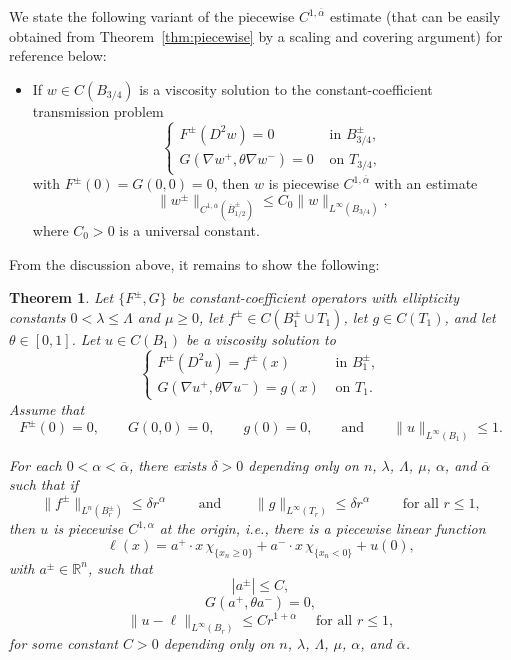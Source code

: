 \documentclass[letter,11pt]{amsart}
\newcommand{\R}{\mathbb{R}}
\newcommand{\chara}[1]{\chi_{#1}}
\newtheorem{thm}{Theorem}[section]
\theoremstyle{definition}
\numberwithin{equation}{section}
\begin{document}
\medskip

We state the following variant of the piecewise $C^{1,\overline{\alpha}}$ estimate (that can be easily obtained from Theorem~\ref{thm:piecewise} by a scaling and covering argument) for reference below:
\begin{itemize}
\item
If $w \in C(B_{3/4})$ is a viscosity solution to the constant-coefficient transmission problem
\[
\begin{cases}
F^{\pm}(D^2 w) = 0 & \text{ in } B_{3/4}^{\pm},\\
G(\nabla w^{+}, \theta \nabla w^{-}) = 0 & \text{ on } T_{3/4},
\end{cases}
\]
with $F^{\pm}(0) = G(0, 0) = 0$,
then $w$ is piecewise $C^{1,\overline{\alpha}}$ with an estimate
\begin{equation}
\label{fund2}
\|w^{\pm}\|_{C^{1,\overline{\alpha}}(\overline{B}^{\pm}_{1/2})} 
\leq C_0 \|w\|_{L^{\infty}(B_{3/4})},
\end{equation}
where $C_0 > 0$ is a universal constant.
\end{itemize}

\medskip

From the discussion above, it remains to show the following:

\begin{thm}
Let $\{F^{\pm}, G\}$ be constant-coefficient operators with ellipticity constants $0 < \lambda \leq \Lambda$ and $\mu \geq 0$, let $f^{\pm} \in C(B_1^{\pm} \cup T_1)$, let $g \in C(T_1)$, and let $\theta \in [0,1]$.
Let $u \in C(B_1)$ be a viscosity solution to 
\[
\begin{cases}
F^{\pm}(D^2 u) = f^{\pm}(x) & \text{ in } B_{1}^{\pm},\\
G(\nabla u^{+}, \theta \nabla u^{-}) = g(x) &\text{ on } T_{1}.
\end{cases}
\]
Assume that 
\begin{equation}
\label{ao1}
F^{\pm}(0) = 0, \qquad G(0,0) = 0, \qquad g(0) = 0, \qquad \text{and} \qquad \|u\|_{L^{\infty}(B_1)} \leq 1.
\end{equation}

For each $0 < \alpha < \overline{\alpha}$, there exists $\delta > 0$ depending only on $n$, $\lambda$, $\Lambda$, $\mu$, $\alpha$, and $\overline{\alpha}$ such that if
\begin{equation}
\label{ao2}
\|f^{\pm}\|_{L^n(B_r^{\pm})} \leq \delta r^{\alpha}
\qquad \text{ and }
\qquad \|g\|_{L^{\infty}(T_r)} \leq \delta r^{\alpha}
\qquad \text{ for all } r \leq 1,
\end{equation}
then $u$ is piecewise $C^{1,\alpha}$ at the origin, i.e., there is a piecewise linear function
\[
\ell(x) = a^{+} \cdot x \, \chara{\{x_n \geq 0\}} + a^{-} \cdot x \, \chara{\{x_n < 0\}} + u(0),
\]
with $a^{\pm} \in \R^n$, such that
\[
|a^{\pm}| \leq C,
\]
\[
G(a^{+}, \theta a^{-}) = 0,
\]
\[
\|u - \ell\|_{L^{\infty}(B_r)} \leq 
Cr^{1 +\alpha}
\quad \text{ for all } r \leq 1,
\]
for some constant $C > 0$ depending only on $n$, $\lambda$, $\Lambda$, $\mu$, $\alpha$, and $\overline{\alpha}$.
\end{thm}
\end{document}
